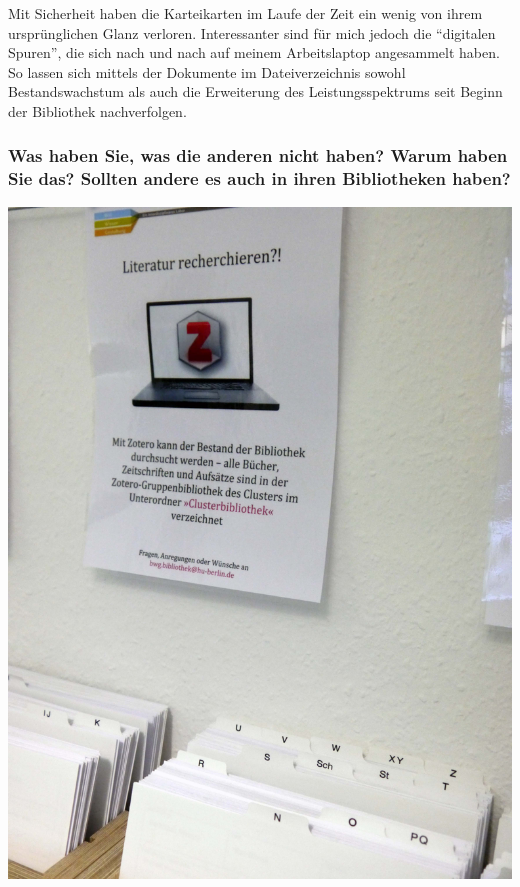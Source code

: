 Mit Sicherheit haben die Karteikarten im Laufe der Zeit ein wenig von
ihrem ursprünglichen Glanz verloren. Interessanter sind für mich jedoch
die \enquote{digitalen Spuren}, die sich nach und nach auf meinem
Arbeitslaptop angesammelt haben. So lassen sich mittels der Dokumente im
Dateiverzeichnis sowohl Bestandswachstum als auch die Erweiterung des
Leistungsspektrums seit Beginn der Bibliothek nachverfolgen.

\hypertarget{was-haben-sie-was-die-anderen-nicht-haben-warum-haben-sie-das-sollten-andere-es-auch-in-ihren-bibliotheken-haben}{%
\subsubsection{Was haben Sie, was die anderen nicht haben? Warum haben Sie
das? Sollten andere es auch in ihren Bibliotheken
haben?}\label{was-haben-sie-was-die-anderen-nicht-haben-warum-haben-sie-das-sollten-andere-es-auch-in-ihren-bibliotheken-haben}}

\begin{center}
\includegraphics{bwg-cluster/img/KarteikartenZotero.jpg}
\end{center}

